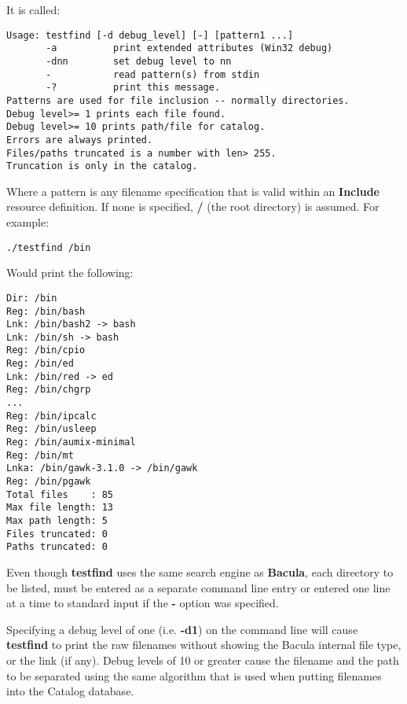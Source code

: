 It is called: 

\footnotesize
\begin{verbatim}
Usage: testfind [-d debug_level] [-] [pattern1 ...]
       -a          print extended attributes (Win32 debug)
       -dnn        set debug level to nn
       -           read pattern(s) from stdin
       -?          print this message.
Patterns are used for file inclusion -- normally directories.
Debug level>= 1 prints each file found.
Debug level>= 10 prints path/file for catalog.
Errors are always printed.
Files/paths truncated is a number with len> 255.
Truncation is only in the catalog.
\end{verbatim}
\normalsize

Where a pattern is any filename specification that is valid within an {\bf
Include} resource definition. If none is specified, {\bf /} (the root
directory) is assumed. For example: 

\footnotesize
\begin{verbatim}
./testfind /bin
\end{verbatim}
\normalsize

Would print the following: 

\footnotesize
\begin{verbatim}
Dir: /bin
Reg: /bin/bash
Lnk: /bin/bash2 -> bash
Lnk: /bin/sh -> bash
Reg: /bin/cpio
Reg: /bin/ed
Lnk: /bin/red -> ed
Reg: /bin/chgrp
...
Reg: /bin/ipcalc
Reg: /bin/usleep
Reg: /bin/aumix-minimal
Reg: /bin/mt
Lnka: /bin/gawk-3.1.0 -> /bin/gawk
Reg: /bin/pgawk
Total files    : 85
Max file length: 13
Max path length: 5
Files truncated: 0
Paths truncated: 0
\end{verbatim}
\normalsize

Even though {\bf testfind} uses the same search engine as {\bf Bacula}, each
directory to be listed, must be entered as a separate command line entry or
entered one line at a time to standard input if the {\bf -} option was
specified. 

Specifying a debug level of one (i.e. {\bf -d1}) on the command line will
cause {\bf testfind} to print the raw filenames without showing the Bacula
internal file type, or the link (if any). Debug levels of 10 or greater cause
the filename and the path to be separated using the same algorithm that is
used when putting filenames into the Catalog database. 
